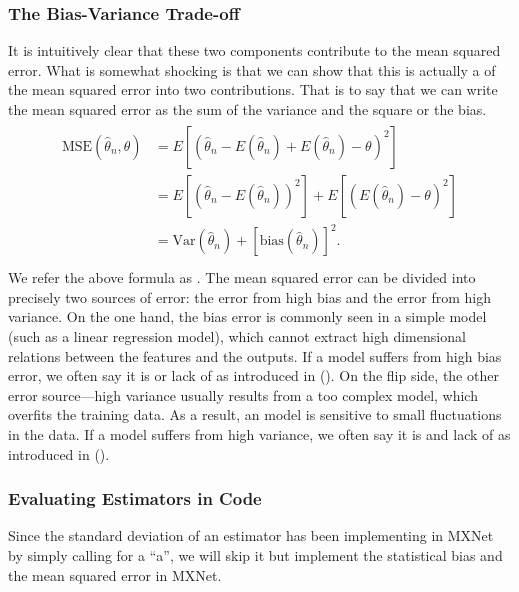 \documentclass[letterpaper,11pt,english]{sphinxmanual}
\begin{document}
\subsubsection{The Bias-Variance Trade-off}
\label{\detokenize{chapter_appendix_math/statistics:the-bias-variance-trade-off}}
It is intuitively clear that these two components contribute to the mean
squared error. What is somewhat shocking is that we can show that this
is actually a  of the mean squared error into two
contributions. That is to say that we can write the mean squared error
as the sum of the variance and the square or the bias.
\begin{equation}\label{equation:chapter_appendix_math/statistics:chapter_appendix_math/statistics:0}
\begin{split}\begin{aligned}
\mathrm{MSE} (\hat{\theta}_n, \theta) &= E[(\hat{\theta}_n - E(\hat{\theta}_n) + E(\hat{\theta}_n) - \theta)^2] \\
 &= E[(\hat{\theta}_n - E(\hat{\theta}_n))^2] + E[(E(\hat{\theta}_n) - \theta)^2] \\
 &= \mathrm{Var} (\hat{\theta}_n) + [\mathrm{bias} (\hat{\theta}_n)]^2.\\
\end{aligned}\end{split}
\end{equation}
We refer the above formula as . The mean
squared error can be divided into precisely two sources of error: the
error from high bias and the error from high variance. On the one hand,
the bias error is commonly seen in a simple model (such as a linear
regression model), which cannot extract high dimensional relations
between the features and the outputs. If a model suffers from high bias
error, we often say it is  or lack of  as
introduced in (). On the flip side, the
other error source—high variance usually results from a too complex
model, which overfits the training data. As a result, an 
model is sensitive to small fluctuations in the data. If a model suffers
from high variance, we often say it is  and lack of
 as introduced in ().


\subsubsection{Evaluating Estimators in Code}
\label{\detokenize{chapter_appendix_math/statistics:evaluating-estimators-in-code}}
Since the standard deviation of an estimator has been implementing in
MXNet by simply calling  for a  “a”, we will skip
it but implement the statistical bias and the mean squared error in
MXNet.
\end{document}
